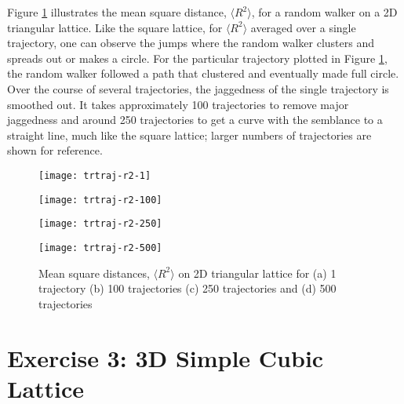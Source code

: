 \documentclass[12pt, oneside]{article}
\begin{document}
Figure \ref{fig:trr2} illustrates the mean square distance, $\langle R^2 \rangle$, for a random walker on a 2D triangular lattice. Like the square lattice, for $\langle R^2 \rangle$ averaged over a single trajectory, one can observe the jumps where the random walker clusters and spreads out or makes a circle. For the particular trajectory plotted in Figure \ref{fig:trr2}, the random walker followed a path that clustered and eventually made full circle. Over the course of several trajectories, the jaggedness of the single trajectory is smoothed out. It takes approximately 100 trajectories to remove major jaggedness and around 250 trajectories to get a curve with the semblance to a straight line, much like the square lattice; larger numbers of trajectories are shown for reference.

\begin{figure}
\begin{minipage}[htbp]{.49\linewidth}
\centering
\texttt{[image: trtraj-r2-1]}
\end{minipage}
\begin{minipage}[htbp]{.49\linewidth}
\centering
\texttt{[image: trtraj-r2-100]}
\end{minipage}
\begin{minipage}[htbp]{.49\linewidth}
\centering
\texttt{[image: trtraj-r2-250]}
\end{minipage}
\begin{minipage}[htbp]{.49\linewidth}
\centering
\texttt{[image: trtraj-r2-500]}
\end{minipage}
\caption{Mean square distances, $\langle R^2 \rangle$ on 2D triangular lattice for (a) 1 trajectory (b) 100 trajectories (c) 250 trajectories and (d) 500 trajectories}
\label{fig:trr2}
\end{figure}

\section{Exercise 3: 3D Simple Cubic Lattice}
\end{document}
